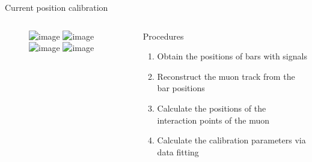 \documentclass{ikpKoeln}
\begin{document}
\begin{frame}[t]{Current position calibration}
	\vspace*{-2em}
	\begin{columns}[t]
		\begin{column}{0.45 \textwidth}
			\begin{figure}[t]
				\includegraphics<1>[width = \textwidth]{R3BCon2024GSI/side_view1.png}
				\includegraphics<2>[width = \textwidth]{R3BCon2024GSI/side_view2.png}
				\includegraphics<3-5>[width = \textwidth]{R3BCon2024GSI/side_view3.png}
				\includegraphics<6>[width = \textwidth]{R3BCon2024GSI/side_view4.png}
			\end{figure}
		\end{column}
		\begin{column}{0.45 \textwidth}
			\begin{exampleblock}{\small Procedures}
				\small
				\begin{enumerate}
					\setlength\itemsep{0em}
					\small
					\item<1-> Obtain the positions of bars with signals
					\item<2-> Reconstruct the muon track from the bar positions
					\item<3-> Calculate the positions of the interaction points of the muon
					\item<4-> Calculate the calibration parameters via data fitting
				\end{enumerate}
			\end{exampleblock}
		\end{column}
	\end{columns}
\end{frame}
\end{document}
